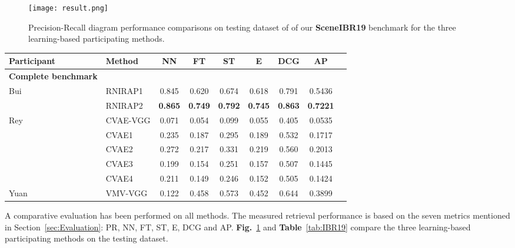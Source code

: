 \documentclass[../main.tex]{subfiles}
\begin{document}
\begin{figure}[!htp]
	\centering
	{
		\texttt{[image: result.png]}
	}
	\caption{ Precision-Recall diagram performance comparisons on testing dataset of of our \textbf{SceneIBR19} benchmark for the three learning-based participating methods.}
	\label{Results}
\end{figure}



\begin{table*}[!htb]
	\centering
	\caption{Performance metrics comparison on the SHREC'19 SceneIBR Track Benchmark.}
	\label{tab:IBR19}
	\begin{tabular}{llccccccc}
		\hline		
		\normalsize {\textbf{Participant}}	&\normalsize {\textbf{Method}} &\normalsize {\textbf{NN}}  &\normalsize {\textbf{FT}} &\normalsize {\textbf{ST}} &\normalsize {\textbf{E}} &\normalsize {\textbf{DCG}} &\normalsize {\textbf{AP}}\\
		\hline
		\textbf{\normalsize{Complete benchmark}}\\
		\hline
		\multirow{2}{*}{Bui} &RNIRAP1 &0.845    &0.620   &0.674   &0.618   
		&0.791  &  0.5436\\	
		\cline{2-8}
		&RNIRAP2 &\textbf{0.865}    &\textbf{0.749}   &\textbf{0.792}   &\textbf{0.745}   &\textbf{0.863} &\textbf{0.7221}\\	
		\hline  		 									
		\multirow{5}{*}{Rey} &CVAE-VGG &0.071    &0.054   &0.099   &0.055   &0.405 &0.0535\\ \cline{2-8}&CVAE1  &0.235    &0.187   &0.295   &0.189   &0.532 &0.1717\\
		\cline{2-8}
		&CVAE2 &0.272    &0.217   &0.331   &0.219   &0.560  &0.2013\\
		\cline{2-8}
		&CVAE3 &0.199    &0.154   &0.251   &0.157   &0.507 &0.1445\\
		\cline{2-8}
		&CVAE4 &0.211    &0.149   &0.246   &0.152   &0.505  &0.1424\\
		\hline							
		Yuan &VMV-VGG &0.122	 &0.458	 &0.573	 &0.452	 &0.644 &0.3899\\			
		\hline		
	\end{tabular}
\end{table*}

A comparative evaluation has been performed on all methods. The measured 
retrieval performance is based on the seven metrics mentioned in 
Section~\ref{sec:Evaluation}: PR, NN, FT, ST, E, DCG and AP. 
\textbf{Fig.}~\ref{Results} and \textbf{Table}~\ref{tab:IBR19} compare the 
three learning-based participating methods on the testing dataset.
\end{document}
